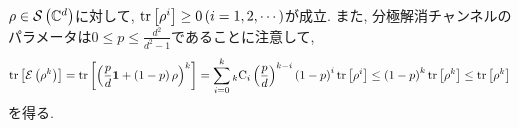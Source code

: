 \begin{ex}
    \label{ex8.18}
    $\rho \in \mathcal{S}\left({\mathbb{C}^{d}}\right)$に対して, $\mathrm{tr}\left[ \rho^i\right] \ge 0 \left( i=1,2,\cdots\right)$が成立. また, 分極解消チャンネルのパラメータは$0 \le p \le \frac{d^2}{d^2-1}$であることに注意して,
    \begin{align*}
        \mathrm{tr}\left[ \mathcal{E} \left( \rho^k\right)\right]
        =
        \mathrm{tr}\left[
            \left(
            \frac{p}{d} \mathbf{1} + \left(1-p\right)\rho
            \right)^k
            \right]
        =
        \sum_{i=0}^k
        {}_{k}\text{C}_{i}
        \left( \frac{p}{d}\right)^{k-i}
        \left(1-p\right)^i
        \mathrm{tr}\left[\rho^i\right]
        \le
        \left(1-p\right)^k \mathrm{tr}\left[\rho^k\right]
        \le
        \mathrm{tr}\left[ \rho^k\right]
    \end{align*}
    を得る.
\end{ex}
